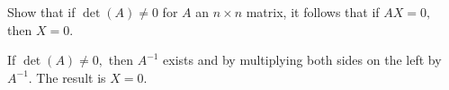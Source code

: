 
\begin{Exercise}[
name={},
title={}, 
difficulty=0,
origin={\cite{KK}}]
Show that if $\det \left( A\right) \neq 0$ for $A$
an $n\times n$ matrix, it follows that if $AX=0,$ then $X=0$. 
\end{Exercise}

\begin{Answer}
If $\det \left( A\right) \neq 0,$ then $A^{-1}$ exists and by
multiplying both sides on the left by $A^{-1}$.  The result is $X=0$.
\end{Answer}
